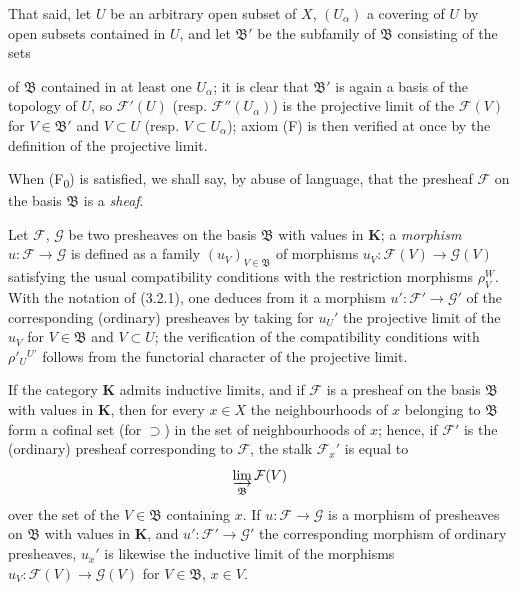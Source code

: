\begin{env}[3.2.2]
That said, let $U$ be an arbitrary open subset of $X$, $(U_\alpha)$ a covering
of $U$ by open subsets contained in $U$, and let $\mathfrak{B}'$ be the
subfamily of $\mathfrak{B}$ consisting of the sets


of $\mathfrak{B}$ contained in at least one $U_\alpha$; it is clear that
$\mathfrak{B}'$ is again a basis of the topology of $U$, so
$\mathcal{F}'(U)$ (resp. $\mathcal{F}''(U_\alpha)$) is the projective limit of the
$\mathcal{F}(V)$ for $V\in\mathfrak{B}'$ and $V\subset U$ (resp.
$V\subset U_\alpha$); axiom (F) is then verified at once by the
definition of the projective limit.

When (F\textsubscript{0}) is satisfied, we shall say, by abuse of language, that
the presheaf $\mathcal{F}$ on the basis $\mathfrak{B}$ is a \emph{sheaf}.
\end{env}

\begin{env}[3.2.3]
\label{0.3.2.3}
Let $\mathcal{F}$, $\mathcal{G}$ be two presheaves on the basis
$\mathfrak{B}$ with values in $\mathbf{K}$; a \emph{morphism}
$u:\mathcal{F}\to\mathcal{G}$ is defined as a family
$(u_V)_{V\in\mathfrak{B}}$ of morphisms
$u_V:\mathcal{F}(V)\to\mathcal{G}(V)$ satisfying the usual compatibility
conditions with the restriction morphisms $\rho_V^W$. With
the notation of (3.2.1), one deduces from it a morphism
$u':\mathcal{F}'\to\mathcal{G}'$ of the corresponding (ordinary) presheaves
by taking for $u_U'$ the projective limit of the $u_V$ for
$V\in\mathfrak{B}$ and $V\subset U$; the verification of the
compatibility conditions with $\rho'_U{}^{U'}$ follows from the functorial character of the
projective limit.
\end{env}

\begin{env}[3.2.4]
\label{0.3.2.4}
If the category $\mathbf{K}$ admits inductive limits, and if $\mathcal{F}$
is a presheaf on the basis $\mathfrak{B}$ with values in $\mathbf{K}$,
then for every $x\in X$ the neighbourhoods of $x$ belonging to $\mathfrak{B}$ form
a cofinal set (for $\supset$) in the set of neighbourhoods of $x$;
hence, if $\mathcal{F}'$ is the (ordinary) presheaf corresponding to
$\mathcal{F}$, the stalk $\mathcal{F}_x'$ is equal to
\[
  \varinjlim_{\mathfrak{B}}\mathcal{F}(V)
\]
over the set of the $V\in\mathfrak{B}$ containing $x$.
If $u:\mathcal{F}\to\mathcal{G}$ is a morphism of presheaves on
$\mathfrak{B}$ with values in $\mathbf{K}$, and
$u':\mathcal{F}'\to\mathcal{G}'$ the corresponding morphism of ordinary
presheaves, $u_x'$ is likewise the inductive limit of the morphisms
$u_V:\mathcal{F}(V)\to\mathcal{G}(V)$ for $V\in\mathfrak{B}$, $x\in V$.
\end{env}

